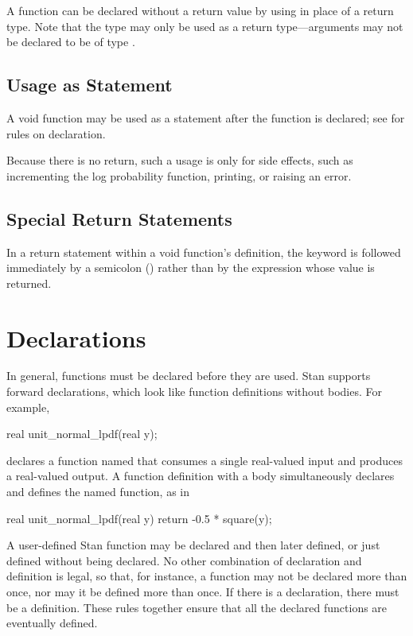 A function can be declared without a return value by using 
in place of a return type.  Note that the type  may only be
used as a return type---arguments may not be declared to be of type
.

\subsection{Usage as Statement}

A void function may be used as a statement after the function is
declared;  see  for rules on declaration.

Because there is no return, such a usage is only for side effects,
such as incrementing the log probability function, printing, or
raising an error.

\subsection{Special Return Statements}

In a return statement within a void function's definition, the
 keyword is followed immediately by a semicolon
(\code{;}) rather than by the expression whose value is returned.


\section{Declarations}\label{forward-declarations.section}

In general, functions must be declared before they are used.  Stan
supports forward declarations, which look like function definitions
without bodies.  For example,
%
\begin{stancode}
real unit_normal_lpdf(real y);
\end{stancode}
%
declares a function named  that consumes a
single real-valued input and produces a real-valued output.  A
function definition with a body simultaneously declares and defines
the named function, as in
%
\begin{stancode}
real unit_normal_lpdf(real y) {
  return -0.5 * square(y);
}
\end{stancode}
%

A user-defined Stan function may be declared and then later defined,
or just defined without being declared.  No other combination of
declaration and definition is legal, so that, for instance, a function
may not be declared more than once, nor may it be defined more than
once.  If there is a declaration, there must be a definition.  These
rules together ensure that all the declared functions are eventually
defined.

